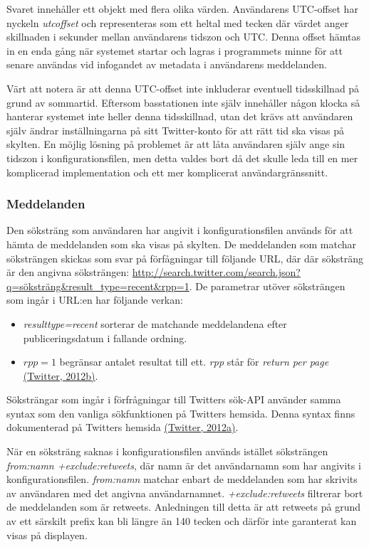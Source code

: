 \documentclass[a4paper,11pt]{article}
\begin{document}
Svaret innehåller ett objekt med flera olika värden. Användarens UTC-offset har nyckeln {\it utc\textunderscore offset} och representeras som ett heltal med tecken där värdet anger skillnaden i sekunder mellan användarens tidszon och UTC. Denna offset hämtas in en enda gång när systemet startar och lagras i programmets minne för att senare användas vid infogandet av metadata i användarens meddelanden.

Värt att notera är att denna UTC-offset inte inkluderar eventuell tidsskillnad på grund av sommartid. Eftersom basstationen inte själv innehåller någon klocka så hanterar systemet inte heller denna tidsskillnad, utan det krävs att användaren själv ändrar inställningarna på sitt Twitter-konto för att rätt tid ska visas på skylten. En möjlig lösning på problemet är att låta användaren själv ange sin tidszon i konfigurationsfilen, men detta valdes bort då det skulle leda till en mer komplicerad implementation och ett mer komplicerat användargränssnitt.

\subsubsection{Meddelanden}
Den söksträng som användaren har angivit i konfigurationsfilen används för att hämta de meddelanden som ska visas på skylten. De meddelanden som matchar söksträngen skickas som svar på förfågningar till följande URL, där där söksträng är den angivna söksträngen: \url{http://search.twitter.com/search.json?q=söksträng&result_type=recent&rpp=1}. De parametrar utöver söksträngen som ingår i URL:en har följande verkan:

	\begin{itemize}
    	\item {\it result\textunderscore type=recent} sorterar de matchande meddelandena efter publiceringsdatum i fallande ordning.
    	\item {\it $rpp=1$} begränsar antalet resultat till ett. {\it rpp} står för {\it return per page} \hyperref[twitter]{(Twitter, 2012b)}.
	\end{itemize}

Söksträngar som ingår i förfrågningar till Twitters sök-API använder samma syntax som den vanliga sökfunktionen på Twitters hemsida. Denna syntax finns dokumenterad på Twitters hemsida \hyperref[twitter]{(Twitter, 2012a)}.

När en söksträng saknas i konfigurationsfilen används istället söksträngen {\it from:namn +exclude:retweets}, där namn är det användarnamn som har angivits i konfigurationsfilen. {\it from:namn} matchar enbart de meddelanden som har skrivits av användaren med det angivna användarnamnet. {\it +exclude:retweets} filtrerar bort de meddelanden som är retweets. Anledningen till detta är att retweets på grund av ett särskilt prefix kan bli längre än 140 tecken och därför inte garanterat kan visas på displayen.
    	
\end{document}
